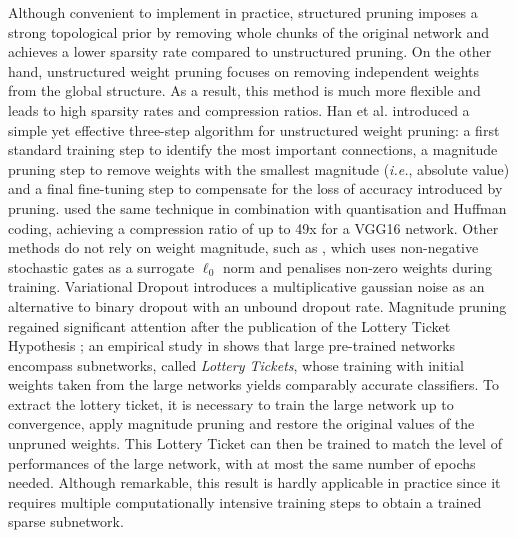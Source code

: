 Although convenient to implement in practice, structured pruning imposes a
strong topological prior by removing whole chunks of the original network and
achieves a lower sparsity rate compared to unstructured pruning. On the other
hand, unstructured weight pruning focuses on removing independent weights from
the global structure. As a result, this method is much more flexible and leads
to high sparsity rates and compression ratios. Han et al.
\cite{DBLP:conf/nips/HanPTD15} introduced a simple yet effective three-step
algorithm for unstructured weight pruning: a first standard training step to
identify the most important connections, a magnitude pruning step to remove
weights with the smallest magnitude (\emph{i.e.}, absolute value) and a final
fine-tuning step to compensate for the loss of accuracy introduced by pruning.
\cite{DBLP:journals/corr/HanMD15} used the same technique in combination with
quantisation and Huffman coding, achieving a compression ratio of up to 49x for
a VGG16 network. Other methods do not rely on weight magnitude, such as
\cite{DBLP:conf/iclr/LouizosWK18}, which uses non-negative stochastic gates as a
surrogate $\ell_0$ norm and penalises non-zero weights during training.
Variational Dropout \cite{DBLP:conf/icml/MolchanovAV17} introduces a
multiplicative gaussian noise as an alternative to binary dropout
\cite{DBLP:journals/corr/abs-1207-0580,DBLP:journals/jmlr/SrivastavaHKSS14} with
an unbound dropout rate. Magnitude pruning regained significant attention after
the publication of the Lottery Ticket Hypothesis
\cite{DBLP:conf/iclr/FrankleC19}; an empirical study in
\cite{DBLP:conf/iclr/FrankleC19} shows that large pre-trained networks encompass
subnetworks, called \textit{Lottery Tickets}, whose training with initial
weights taken from the large networks yields comparably accurate classifiers. To
extract the lottery ticket, it is necessary to train the large network up to
convergence, apply magnitude pruning and restore the original values of the
unpruned weights. This Lottery Ticket can then be trained to match the level of
performances of the large network, with at most the same number of epochs
needed. Although remarkable, this result is hardly applicable in practice since
it requires multiple computationally intensive training steps to obtain a
trained sparse subnetwork.\\


